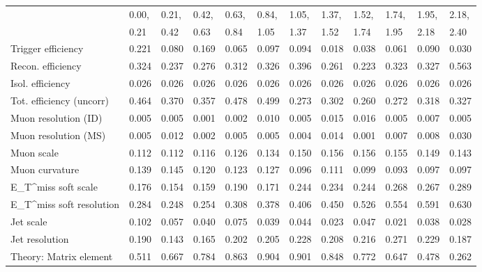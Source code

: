 \begin{tabular}{l|p{0.6cm}p{0.6cm}p{0.6cm}p{0.6cm}p{0.6cm}p{0.6cm}p{0.6cm}p{0.6cm}p{0.6cm}p{0.6cm}p{0.6cm}}
\hline
   & 0.00, & 0.21, & 0.42, & 0.63, & 0.84, & 1.05, & 1.37, & 1.52, & 1.74, & 1.95, & 2.18,  \\ 
   & 0.21 & 0.42 & 0.63 & 0.84 & 1.05 & 1.37 & 1.52 & 1.74 & 1.95 & 2.18 & 2.40  \\ 
\hline
Trigger efficiency                       & 0.221 & 0.080 & 0.169 & 0.065 & 0.097 & 0.094 & 0.018 & 0.038 & 0.061 & 0.090 & 0.030 \\
Recon. efficiency                        & 0.324 & 0.237 & 0.276 & 0.312 & 0.326 & 0.396 & 0.261 & 0.223 & 0.323 & 0.327 & 0.563 \\
Isol. efficiency                         & 0.026 & 0.026 & 0.026 & 0.026 & 0.026 & 0.026 & 0.026 & 0.026 & 0.026 & 0.026 & 0.026 \\
Tot. efficiency (uncorr)                 & 0.464 & 0.370 & 0.357 & 0.478 & 0.499 & 0.273 & 0.302 & 0.260 & 0.272 & 0.318 & 0.327 \\
Muon resolution (ID)                     & 0.005 & 0.005 & 0.001 & 0.002 & 0.010 & 0.005 & 0.015 & 0.016 & 0.005 & 0.007 & 0.005 \\
Muon resolution (MS)                     & 0.005 & 0.012 & 0.002 & 0.005 & 0.005 & 0.004 & 0.014 & 0.001 & 0.007 & 0.008 & 0.030 \\
Muon scale                               & 0.112 & 0.112 & 0.116 & 0.126 & 0.134 & 0.150 & 0.156 & 0.156 & 0.155 & 0.149 & 0.143 \\
Muon curvature                           & 0.139 & 0.145 & 0.120 & 0.123 & 0.127 & 0.096 & 0.111 & 0.099 & 0.093 & 0.097 & 0.097 \\
E_{T}^{miss} soft scale                  & 0.176 & 0.154 & 0.159 & 0.190 & 0.171 & 0.244 & 0.234 & 0.244 & 0.268 & 0.267 & 0.289 \\
E_{T}^{miss} soft resolution             & 0.284 & 0.248 & 0.254 & 0.308 & 0.378 & 0.406 & 0.450 & 0.526 & 0.554 & 0.591 & 0.630 \\
Jet scale                                & 0.102 & 0.057 & 0.040 & 0.075 & 0.039 & 0.044 & 0.023 & 0.047 & 0.021 & 0.038 & 0.028 \\
Jet resolution                           & 0.190 & 0.143 & 0.165 & 0.202 & 0.205 & 0.228 & 0.208 & 0.216 & 0.271 & 0.229 & 0.187 \\
Theory: Matrix element                   & 0.511 & 0.667 & 0.784 & 0.863 & 0.904 & 0.901 & 0.848 & 0.772 & 0.647 & 0.478 & 0.262 \\

\end{tabular}
